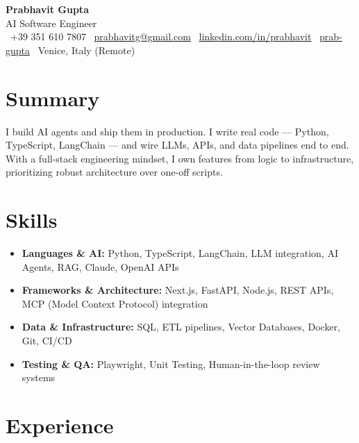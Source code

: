\documentclass[a4paper,10pt]{article}
\begin{document}
\begin{center}
 {\Huge\bfseries Prabhavit Gupta}\\[3pt]
 {\color{accent}\large AI Software Engineer}\\[5pt]
 \faPhone\ +39 351 610 7807 \quad
 \faEnvelope\ \href{mailto:prabhavitg@gmail.com}{prabhavitg@gmail.com} \quad
 \faLinkedin\ \href{https://www.linkedin.com/in/prabhavit/}{linkedin.com/in/prabhavit} \quad
 \faGithub\ \href{https://github.com/prab-gupta}{prab-gupta} \quad
 \faMapMarker*\ Venice, Italy (Remote)
\end{center}

\section{Summary}
I build AI agents and ship them in production. I write real code — Python, TypeScript, LangChain — and wire LLMs, APIs, and data pipelines end to end. With a full-stack engineering mindset, I own features from logic to infrastructure, prioritizing robust architecture over one-off scripts.

\section{Skills}
\begin{itemize}
 \item \textbf{Languages \& AI:} Python, TypeScript, LangChain, LLM integration, AI Agents, RAG, Claude, OpenAI APIs
 \item \textbf{Frameworks \& Architecture:} Next.js, FastAPI, Node.js, REST APIs, MCP (Model Context Protocol) integration
 \item \textbf{Data \& Infrastructure:} SQL, ETL pipelines, Vector Databases, Docker, Git, CI/CD
 \item \textbf{Testing \& QA:} Playwright, Unit Testing, Human-in-the-loop review systems
\end{itemize}

\section{Experience}
\end{document}
